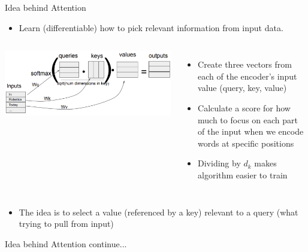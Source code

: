 \documentclass{beamer}
\begin{document}
\begin{frame}{Idea behind Attention}

\begin{itemize}
    \item Learn (differentiable) how to pick relevant information from input data.
\end{itemize}

\begin{columns}
        \includegraphics[width=1.2\linewidth]{f9.png} 

      \begin{itemize}
        \item Create three vectors from each of the encoder’s input value (query, key, value)
        \item Calculate a score for how much to focus on each part of the input when we encode words at specific positions
        \item Dividing by $d_k$ makes algorithm easier to train
      \end{itemize}
    \end{columns}

\begin{itemize}
    \item The idea is to select a value (referenced by a key) relevant to a query (what trying to pull from input)
\end{itemize}

\end{frame}

\begin{frame}{Idea behind Attention continue...}
    
\end{frame}
\end{document}
